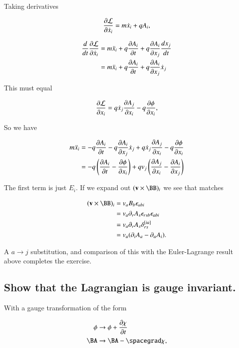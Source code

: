 Taking derivatives

\begin{equation}\label{eqn:classicalMechanicsPs1:80}
\PD{\xdot_i}{\LL} = m \xdot_i + q A_i,
\end{equation}

\begin{align*}
\frac{d}{dt} \PD{\xdot_i}{\LL} 
&= 
m \ddot{x}_i 
+ q \PD{t}{A_i}
+ q \PD{x_j}{A_i} \frac{dx_j}{dt} \\
&=
m \ddot{x}_i 
+ q \PD{t}{A_i}
+ q \PD{x_j}{A_i} \xdot_j
\end{align*}

This must equal

\begin{equation}\label{eqn:classicalMechanicsPs1:100}
\PD{x_i}{\LL} = q \xdot_j \PD{x_i}{A_j} - q \PD{x_i}{\phi},
\end{equation}

So we have

\begin{align*}
m \ddot{x}_i 
&= 
-q \PD{t}{A_i}
- q \PD{x_j}{A_i} \xdot_j
+q \xdot_j \PD{x_i}{A_j} - q \PD{x_i}{\phi} \\
&=
-q \left( \PD{t}{A_i} - \PD{x_i}{\phi} \right)
+q v_j \left( \PD{x_i}{A_j} - \PD{x_j}{A_i} \right)
\end{align*}

The first term is just $E_i$.  If we expand out $(\Bv \cross \BB)_i$ we see that matches

\begin{align*}
(\Bv \cross \BB)_i
&=
v_a B_b \epsilon_{abi} \\
&=
v_a \partial_r A_s \epsilon_{rsb} \epsilon_{abi} \\
&=
v_a \partial_r A_s \delta_{rs}^{[ia]} \\
&=
v_a (\partial_i A_a - \partial_a A_i).
\end{align*}

A $a \rightarrow j$ substitution, and comparison of this with the Euler-Lagrange result above completes the exercise.

\subsection{Show that the Lagrangian is gauge invariant.}

With a gauge transformation of the form

\begin{align}\label{eqn:classicalMechanicsPs1:120}
\phi &\rightarrow \phi + \PD{t}{\chi} \\
\BA &\rightarrow \BA - \spacegrad \chi,
\end{align}

